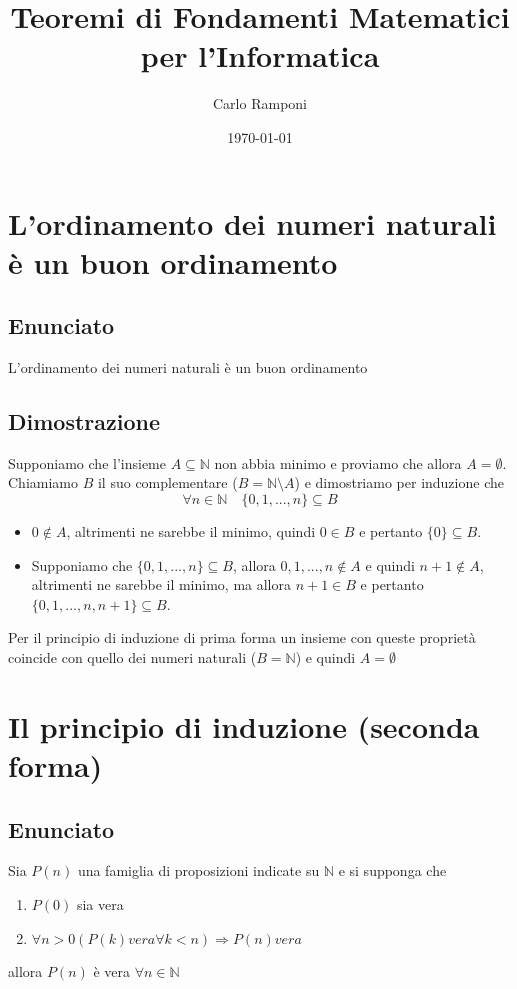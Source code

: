\documentclass[a4paper,12pt]{article}
\begin{document}
\title{Teoremi di Fondamenti Matematici per l'Informatica}
\author{Carlo Ramponi}
\date{\today}
\maketitle

\newpage

\tableofcontents

\clearpage

\section{L'ordinamento dei numeri naturali è un buon ordinamento} 
\subsection*{Enunciato}
L'ordinamento dei numeri naturali è un buon ordinamento
\subsection*{Dimostrazione}
Supponiamo che l'insieme $ A \subseteq \mathbb{N} $ non abbia minimo e proviamo che allora $ A = \emptyset $. Chiamiamo $ B $ il suo complementare ($ B = \mathbb{N} \setminus A $) e dimostriamo per induzione che \[ \forall n \in \mathbb{N} \quad \{0, 1, ..., n\} \subseteq B \]
\begin{itemize}
	\item $ 0 \notin A  $, altrimenti ne sarebbe il minimo, quindi $ 0 \in B $ e pertanto $ \{0\} \subseteq B $.
	\item Supponiamo che $\{0, 1, ..., n\} \subseteq B$, allora $0, 1, ..., n \notin A$ e quindi $n+1 \notin A$, altrimenti ne sarebbe il minimo, ma allora $n+1 \in B$ e pertanto $\{0, 1, ..., n, n+1\} \subseteq B$.\\
\end{itemize}
Per il principio di induzione di prima forma un insieme con queste proprietà coincide con quello dei numeri naturali ($B = \mathbb{N}$) e quindi $A = \emptyset$

\clearpage
\section{Il principio di induzione (seconda forma)}
\subsection*{Enunciato}
Sia $P(n)$ una famiglia di proposizioni indicate su $\mathbb{N}$ e si supponga che
\begin{enumerate}
	\item $P(0)$ sia vera
	\item $\forall n > 0 (P(k) vera \forall k < n) \Rightarrow P(n) vera$
\end{enumerate}
allora $P(n)$ è vera $\forall n \in \mathbb{N}$
\end{document}
